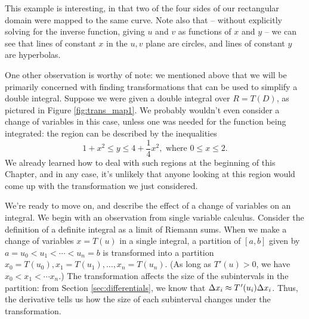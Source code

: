 {{
}}

This example is interesting, in that two of the four sides of our rectangular domain were mapped to the same curve. Note also that -- without explicitly solving for the inverse function, giving $u$ and $v$ as functions of $x$ and $y$ -- we can see that lines of constant $x$ in the $u,v$ plane are circles, and lines of constant $y$ are hyperbolas.

One other observation is worthy of note: we mentioned above that we will be primarily concerned with finding transformations that can be used to simplify a double integral. Suppose we were given a double integral over $R=T(D)$, as pictured in Figure \ref{fig:trans_map1}. We probably wouldn't even consider a change of variables in this case, unless one was needed for the function being integrated: the region can be described by the inequalities
\[
1+x^2\leq y\leq 4+\frac14 x^2, \text { where } 0\leq x\leq 2.
\]
We already learned how to deal with such regions at the beginning of this Chapter, and in any case, it's unlikely that anyone looking at this region would come up with the transformation we just considered.

We're ready to move on, and describe the effect of a change of variables on an integral.
We begin with an observation from single variable calculus. Consider the definition of a definite integral as a limit of Riemann sums. When we make a change of variables $x=T(u)$ in a single integral, a partition of $[a,b]$ given by $a=u_0<u_1<\cdots <u_n=b$ is transformed into a partition $x_0=T(u_0),x_1=T(u_1), \ldots, x_n=T(u_n)$. (As long as $T'(u)>0$, we have $x_0<x_1<\cdots x_n$.) The transformation affects the size of the subintervals in the partition: from Section \ref{sec:differentials}, we know that $\Delta x_i \approx T\hskip.75pt' (u_i)\Delta x_i$. Thus, the derivative tells us how the size of each subinterval changes under the transformation.


